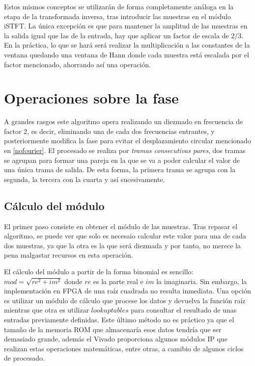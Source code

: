 Estos mismos conceptos se utilizarán de forma completamente análoga en la etapa de la transformada inversa, tras introducir las muestras en el módulo iSTFT. La única excepción es que para mantener la amplitud de las muestras en la salida igual que las de la entrada, hay que aplicar un factor de escala de $2/3$. En la práctica, lo que se hará será realizar la multiplicación a las constantes de la ventana quedando una ventana de Hann donde cada muestra está escalada por el factor mencionado, ahorrando así una operación.

\section{Operaciones sobre la fase}
A grandes rasgos este algoritmo opera realizando un diezmado en frecuencia de factor 2, es decir, eliminando una de cada dos frecuencias entrantes, y posteriormente modifica la fase para evitar el desplazamiento circular mencionado en \ref{nofourier}. El procesado se realiza por \emph{tramas consecutivas pares}, dos tramas se agrupan para formar una pareja en la que se va a poder calcular el valor de una única trama de salida. De esta forma, la primera trama se agrupa con la segunda, la tercera con la cuarta y así sucesivamente.

\subsection{Cálculo del módulo}
El primer paso consiste en obtener el módulo de las muestras. Tras repasar el algoritmo, se puede ver que solo es necesaio calcular este valor para una de cada dos muestras, ya que la otra es la que será diezmada y por tanto, no merece la pena malgastar recursos en esta operación. 

El cálculo del módulo a partir de la forma binomial es sencillo: $mod = \sqrt{re^{2}+im^{2}}$ donde $re$ es la parte real e $im$ la imaginaria. Sin embargo, la implementación en FPGA de una raíz cuadrada no resulta inmediata. Una opción es utilizar un módulo de cálculo que procese los datos y devuelva la función raíz mientras que otra es utilizar $lookup tables$ para consultar el resultado de unas entradas previamente definidas. Este último método no es práctico ya que el tamaño de la memoria ROM que almacenaría esos datos tendría que ser demasiado grande, además el Vivado proporciona algunos módulos IP que realizan estas operaciones matemáticas, entre otras, a camibio de algunos ciclos de procesado.


